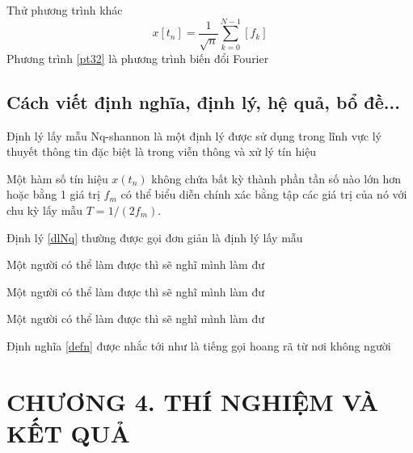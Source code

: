 Thử phương trình khác 
\begin{equation}
    \label{pt32}
    x[t_n] = \frac{1}{\sqrt{n}} \sum_{k=0}^{N-1}[f_k]
\end{equation}
Phương trình \ref{pt32} là phương trình biến đổi Fourier
\subsection{Cách viết định nghĩa, định lý, hệ quả, bổ đề...}
Định lý lấy mẫu Nq-shannon là một định lý được sử dụng trong lĩnh vực lý thuyết thông tin đặc biệt là trong viễn thông và xử lý tín hiệu 
\begin{theorem} %
    \label{dlNq}
    Một hàm số tín hiệu  $x(t_n)$ không chứa bất kỳ thành phần tần số nào lớn hơn hoặc bằng 1 giá trị $f_m$ có thể biểu diễn chính xác bằng tập các giá trị của nó với chu kỳ lấy mẫu $T = 1/(2f_m)$.
\end{theorem}
Định lý \ref{dlNq} thường được gọi đơn giản là định lý lấy mẫu 
\begin{corollary}
    Một người có thể làm được thì sẽ nghĩ mình làm đư
\end{corollary}
\begin{lemma}
    Một người có thể làm được thì sẽ nghĩ mình làm đư
\end{lemma}
\begin{defn}
    \label{defn}
    Một người có thể làm được thì sẽ nghĩ mình làm đư
\end{defn}
Định nghĩa \ref{defn} được nhắc tới như là tiếng gọi hoang rã từ nơi không người
\cleardoublepage

\section*{\centering CHƯƠNG 4. THÍ NGHIỆM VÀ KẾT QUẢ}
\setcounter{section}{4}
\setcounter{subsection}{0}
\setcounter{figure}{0}
\setcounter{table}{0}
